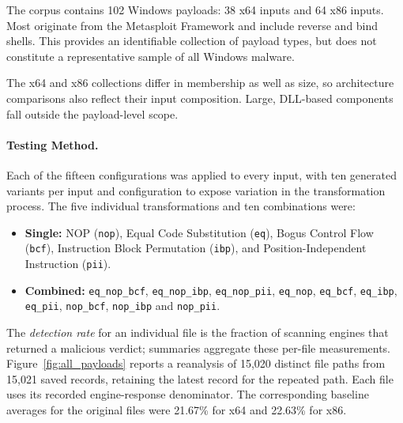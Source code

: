 \documentclass[runningheads]{llncs}
\begin{document}
The corpus contains 102 Windows payloads: 38 x64 inputs and 64 x86 inputs. Most originate from the Metasploit Framework and include reverse and bind shells. This provides an identifiable collection of payload types, but does not constitute a representative sample of all Windows malware.

The x64 and x86 collections differ in membership as well as size, so
architecture comparisons also reflect their input composition. Large,
DLL-based components fall outside the payload-level scope.

\paragraph{Testing Method.}
Each of the fifteen configurations was applied to every input, with ten generated variants per input and configuration to expose variation in the transformation process. The five individual transformations and ten combinations were:

\begin{itemize}
    \item \textbf{Single:} NOP (\texttt{nop}), Equal Code Substitution (\texttt{eq}), Bogus Control Flow (\texttt{bcf}), Instruction Block Permutation (\texttt{ibp}), and Position-Independent Instruction (\texttt{pii}).
    \item \textbf{Combined:} \texttt{eq\_nop\_bcf}, \texttt{eq\_nop\_ibp}, \texttt{eq\_nop\_pii}, \texttt{eq\_nop}, \texttt{eq\_bcf}, \texttt{eq\_ibp}, \texttt{eq\_pii}, \texttt{nop\_bcf}, \texttt{nop\_ibp} and \texttt{nop\_pii}.
\end{itemize}

The \emph{detection rate} for an individual file is the fraction of scanning engines that returned a malicious verdict; summaries aggregate these per-file measurements. Figure~\ref{fig:all_payloads} reports a reanalysis of 15,020 distinct
file paths from 15,021 saved records, retaining the latest record for the
repeated path. Each file uses its recorded engine-response denominator. The corresponding baseline averages for the original files were 21.67\% for x64 and 22.63\% for x86.
\end{document}
